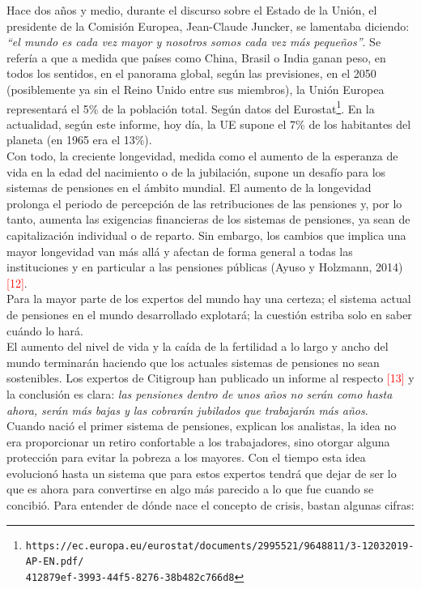 \vspace{-0.3cm}
Hace dos a\~nos y medio, durante el discurso sobre el Estado de la Unión, el presidente de la Comisión Europea, Jean-Claude Juncker, se lamentaba diciendo: \textit{``el mundo es cada vez mayor y nosotros somos cada vez más pequeños''}. Se refería a que a medida que países como China, Brasil o India ganan peso, en todos los sentidos, en el panorama global, según las previsiones, en el 2050 (posiblemente ya sin el Reino Unido entre sus miembros), la Unión Europea representará el 5\% de la población total. Según datos del Eurostat\footnote{\texttt{\small{https://ec.europa.eu/eurostat/documents/2995521/9648811/3-12032019-AP-EN.pdf/\\412879ef-3993-44f5-8276-38b482c766d8}}}. En la actualidad, según este informe, hoy día, la UE supone el 7\% de los habitantes del planeta (en 1965 era el 13\%).\\

\vspace{-0.3cm}
Con todo, la creciente longevidad, medida como el aumento de la esperanza de vida en la edad del nacimiento o de la jubilaci\'on, supone un desaf\'io para los sistemas de pensiones en el \'ambito mundial. El aumento de la longevidad prolonga el periodo de percepci\'on de las retribuciones de las pensiones y, por lo tanto, aumenta las exigencias financieras de los sistemas de pensiones, ya sean de capitalizaci\'on individual o de reparto. Sin embargo, los cambios que implica una mayor longevidad van m\'as all\'a y afectan de forma general a todas las instituciones y en particular a las pensiones p\'ublicas (Ayuso y Holzmann, 2014) \textcolor{red}{[12]}.\\

\vspace{-0.3cm}
Para la mayor parte de los expertos del mundo hay una certeza; el sistema actual de pensiones en el mundo desarrollado explotar\'a; la cuesti\'on estriba  solo en saber cu\'ando lo har\'a.\\
El aumento del nivel de vida y la ca\'ida de la fertilidad a lo largo y ancho del mundo terminar\'an haciendo que los actuales sistemas de pensiones no sean sostenibles. Los expertos de Citigroup han publicado un informe al respecto \textcolor{red}{[13]} y la conclusi\'on es clara: \textit{las pensiones dentro de unos a\~nos no ser\'an como hasta ahora, ser\'an m\'as bajas y las cobrar\'an jubilados que trabajar\'an m\'as a\~nos}.\\

\vspace{-0.3cm}
Cuando naci\'o el primer sistema de pensiones, explican los analistas, la idea no era proporcionar un retiro confortable a los trabajadores, sino otorgar alguna protecci\'on para evitar la pobreza a los mayores. Con el tiempo esta idea evolucion\'o hasta un sistema que para estos expertos tendr\'a que dejar de ser lo que es ahora para convertirse en algo m\'as parecido a lo que fue cuando se concibi\'o. Para entender de d\'onde nace el concepto de crisis, bastan algunas cifras:\\

